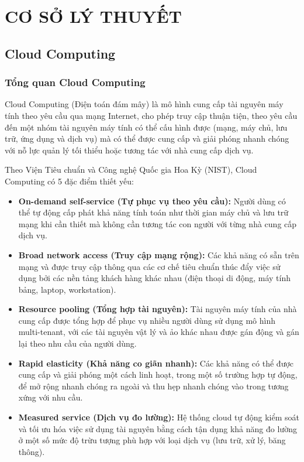 \section{CƠ SỞ LÝ THUYẾT}

\subsection{Cloud Computing}

\subsubsection{Tổng quan Cloud Computing}
Cloud Computing (Điện toán đám mây) là mô hình cung cấp tài nguyên máy tính theo yêu cầu qua mạng Internet, cho phép truy cập thuận tiện, theo yêu cầu đến một nhóm tài nguyên máy tính có thể cấu hình được (mạng, máy chủ, lưu trữ, ứng dụng và dịch vụ) mà có thể được cung cấp và giải phóng nhanh chóng với nỗ lực quản lý tối thiểu hoặc tương tác với nhà cung cấp dịch vụ.

Theo Viện Tiêu chuẩn và Công nghệ Quốc gia Hoa Kỳ (NIST), Cloud Computing có 5 đặc điểm thiết yếu:

\begin{itemize}
    \item \textbf{On-demand self-service (Tự phục vụ theo yêu cầu):} Người dùng có thể tự động cấp phát khả năng tính toán như thời gian máy chủ và lưu trữ mạng khi cần thiết mà không cần tương tác con người với từng nhà cung cấp dịch vụ.
    
    \item \textbf{Broad network access (Truy cập mạng rộng):} Các khả năng có sẵn trên mạng và được truy cập thông qua các cơ chế tiêu chuẩn thúc đẩy việc sử dụng bởi các nền tảng khách hàng khác nhau (điện thoại di động, máy tính bảng, laptop, workstation).
    
    \item \textbf{Resource pooling (Tổng hợp tài nguyên):} Tài nguyên máy tính của nhà cung cấp được tổng hợp để phục vụ nhiều người dùng sử dụng mô hình multi-tenant, với các tài nguyên vật lý và ảo khác nhau được gán động và gán lại theo nhu cầu của người dùng.
    
    \item \textbf{Rapid elasticity (Khả năng co giãn nhanh):} Các khả năng có thể được cung cấp và giải phóng một cách linh hoạt, trong một số trường hợp tự động, để mở rộng nhanh chóng ra ngoài và thu hẹp nhanh chóng vào trong tương xứng với nhu cầu.
    
    \item \textbf{Measured service (Dịch vụ đo lường):} Hệ thống cloud tự động kiểm soát và tối ưu hóa việc sử dụng tài nguyên bằng cách tận dụng khả năng đo lường ở một số mức độ trừu tượng phù hợp với loại dịch vụ (lưu trữ, xử lý, băng thông).
\end{itemize}

